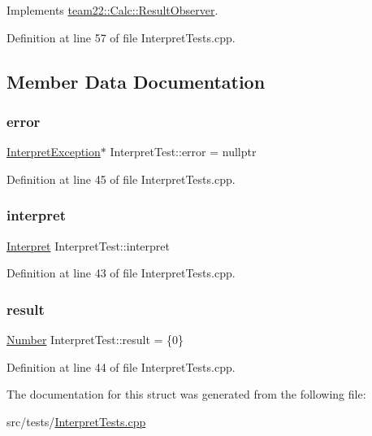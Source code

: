 Implements \hyperlink{classteam22_1_1_calc_1_1_result_observer_aa04007df3aa8a499c3a511f549238285}{team22\+::\+Calc\+::\+Result\+Observer}.



Definition at line 57 of file Interpret\+Tests.\+cpp.



\subsection{Member Data Documentation}
\mbox{\label{struct_interpret_test_aace2257ef8c92219d240f5e2e430bd2b}} 
\subsubsection{\texorpdfstring{error}{error}}
{\footnotesize\ttfamily \hyperlink{class_interpret_exception}{Interpret\+Exception}$\ast$ Interpret\+Test\+::error = nullptr}



Definition at line 45 of file Interpret\+Tests.\+cpp.

\mbox{\label{struct_interpret_test_a3905fe89984120323e1dd28b2abd6052}} 
\subsubsection{\texorpdfstring{interpret}{interpret}}
{\footnotesize\ttfamily \hyperlink{classteam22_1_1_calc_1_1_interpret}{Interpret} Interpret\+Test\+::interpret}



Definition at line 43 of file Interpret\+Tests.\+cpp.

\mbox{\label{struct_interpret_test_a8a1290387dfa72192d3ea06873ff8e73}} 
\subsubsection{\texorpdfstring{result}{result}}
{\footnotesize\ttfamily \hyperlink{classteam22_1_1_math_1_1_number}{Number} Interpret\+Test\+::result = \{0\}}



Definition at line 44 of file Interpret\+Tests.\+cpp.



The documentation for this struct was generated from the following file\+:\begin{DoxyCompactItemize}
\item 
src/tests/\hyperlink{_interpret_tests_8cpp}{Interpret\+Tests.\+cpp}\end{DoxyCompactItemize}
